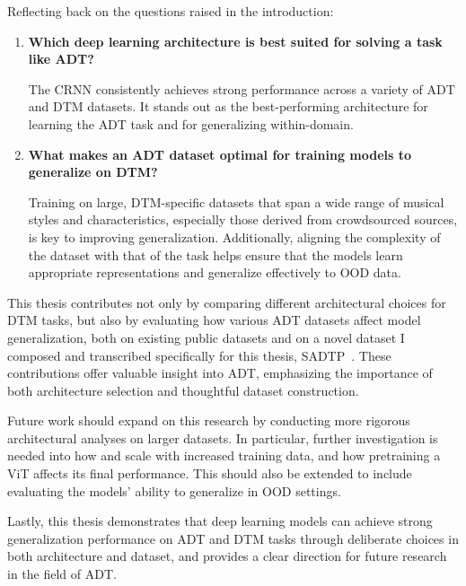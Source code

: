 Reflecting back on the questions raised in the introduction:
\begin{enumerate}
    \item \textbf{Which deep learning architecture is best suited for solving a task like \gls{ADT}?} 
    \par The \acrlong{CRNN} consistently achieves strong performance across a variety of \gls{ADT} and \gls{DTM} datasets. It stands out as the best-performing architecture for learning the \gls{ADT} task and for generalizing within-domain.
    \item \textbf{What makes an \gls{ADT} dataset optimal for training models to generalize on \gls{DTM}?} 
    \par Training on large, \gls{DTM}-specific datasets that span a wide range of musical styles and characteristics, especially those derived from crowdsourced sources, is key to improving generalization. Additionally, aligning the complexity of the dataset with that of the task helps ensure that the models learn appropriate representations and generalize effectively to \acrfull{OOD} data.
\end{enumerate}

This thesis contributes not only by comparing different architectural choices for \gls{DTM} tasks, but also by evaluating how various \gls{ADT} datasets affect model generalization, both on existing public datasets and on a novel dataset I composed and transcribed specifically for this thesis, SADTP~\cite{fosse_sadtp_2025}. These contributions offer valuable insight into \gls{ADT}, emphasizing the importance of both architecture selection and thoughtful dataset construction.

Future work should expand on this research by conducting more rigorous architectural analyses on larger datasets. In particular, further investigation is needed into how  and  scale with increased training data, and how pretraining a \acrshort{ViT} affects its final performance. This should also be extended to include evaluating the models' ability to generalize in \gls{OOD} settings.

Lastly, this thesis demonstrates that deep learning models can achieve strong generalization performance on \gls{ADT} and \gls{DTM} tasks through deliberate choices in both architecture and dataset, and provides a clear direction for future research in the field of \acrlong{ADT}.